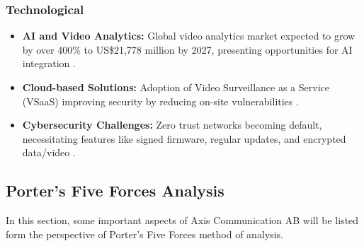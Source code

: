 \documentclass{article}
\begin{document}
\subsubsection{Technological}
\begin{itemize}
    \item \textbf{AI and Video Analytics:} Global video analytics market expected to grow by over 400\% to US\$21,778 million by 2027, presenting opportunities for AI integration \cite{aipix2023}.
    \item \textbf{Cloud-based Solutions:} Adoption of Video Surveillance as a Service (VSaaS) improving security by reducing on-site vulnerabilities \cite{aipix2023}.
    \item \textbf{Cybersecurity Challenges:} Zero trust networks becoming default, necessitating features like signed firmware, regular updates, and encrypted data/video \cite{axis2022}.
\end{itemize}


\subsection{Porter's Five Forces Analysis}
In this section, some important aspects of Axis Communication AB will be listed form the perspective of Porter's Five Forces method of analysis.
\end{document}
